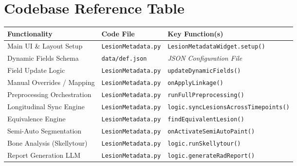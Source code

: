 \documentclass[a4paper,10pt]{article}
\begin{document}
\section{Codebase Reference Table}
\begin{table}[H]
\centering
\footnotesize
\begin{tabular}{@{}lll@{}}
\toprule
\textbf{Functionality} & \textbf{Code File} & \textbf{Key Function(s)} \\ \midrule
\rowcolor{slicercode} Main UI \& Layout Setup & \texttt{LesionMetadata.py} & \texttt{LesionMetadataWidget.setup()} \\
Dynamic Fields Schema & \texttt{data/def.json} & \textit{JSON Configuration File} \\
\rowcolor{slicercode} Field Update Logic & \texttt{LesionMetadata.py} & \texttt{updateDynamicFields()} \\
Manual Overrides / Mapping & \texttt{LesionMetadata.py} & \texttt{onApplyLinkage()} \\
\rowcolor{slicercode} Preprocessing Orchestration & \texttt{LesionMetadata.py} & \texttt{runFullPreprocessing()} \\
Longitudinal Sync Engine & \texttt{LesionMetadata.py} & \texttt{logic.syncLesionsAcrossTimepoints()} \\
\rowcolor{slicercode} Equivalence Engine & \texttt{LesionMetadata.py} & \texttt{findEquivalentLesion()} \\
Semi-Auto Segmentation & \texttt{LesionMetadata.py} & \texttt{onActivateSemiAutoPaint()} \\
\rowcolor{slicercode} Bone Analysis (Skellytour) & \texttt{LesionMetadata.py} & \texttt{logic.runSkellytour()} \\
Report Generation LLM & \texttt{LesionMetadata.py} & \texttt{logic.generateRadReport()} \\
\bottomrule
\end{tabular}
\end{table}
\end{document}
